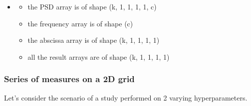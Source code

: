 \documentclass[letterpaper,10pt,english]{sphinxmanual}
\begin{document}
\begin{itemize}
\begin{description}
\begin{itemize}
\end{itemize}

\end{description}

\item {} \begin{description}
\begin{itemize}
\item {} 
\sphinxAtStartPar
the PSD array is of shape (k, 1, 1, 1, 1, c)

\item {} 
\sphinxAtStartPar
the frequency array is of shape (c)

\item {} 
\sphinxAtStartPar
the abscissa array is of shape (k, 1, 1, 1, 1)

\item {} 
\sphinxAtStartPar
all the result arrays are of shape (k, 1, 1, 1, 1)

\end{itemize}

\end{description}

\end{itemize}


\subsubsection{Series of measures on a 2D grid}
\label{\detokenize{source/normalization:series-of-measures-on-a-2d-grid}}
\sphinxAtStartPar
Let’s consider the scenario of a study performed on 2 varying hyperparameters.
\end{document}
